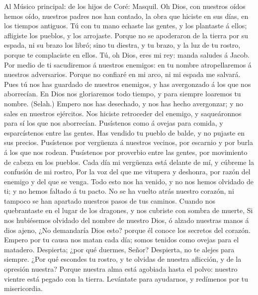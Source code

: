  Al Músico principal: de los hijos de Coré: Masquil. Oh
Dios, con nuestros oídos hemos oído, nuestros padres nos han contado, la
obra que hiciste en sus días, en los tiempos antiguos.  Tú
con tu mano echaste las gentes, y los plantaste á ellos; afligiste los
pueblos, y los arrojaste.  Porque no se apoderaron de la
tierra por su espada, ni su brazo los libró; sino tu diestra, y tu
brazo, y la luz de tu rostro, porque te complaciste en ellos.
 Tú, oh Dios, eres mi rey: manda saludes á Jacob.
 Por medio de ti sacudiremos á nuestros enemigos: en tu
nombre atropellaremos á nuestros adversarios.  Porque no
confiaré en mi arco, ni mi espada me salvará.  Pues tú nos
has guardado de nuestros enemigos, y has avergonzado á los que nos
aborrecían.  En Dios nos gloriaremos todo tiempo, y para
siempre loaremos tu nombre. (Selah.)  Empero nos has
desechado, y nos has hecho avergonzar; y no sales en nuestros ejércitos.
 Nos hiciste retroceder del enemigo, y saqueáronnos para
sí los que nos aborrecían.  Pusístenos como á ovejas para
comida, y esparcístenos entre las gentes.  Has vendido tu
pueblo de balde, y no pujaste en sus precios.  Pusístenos
por vergüenza á nuestros vecinos, por escarnio y por burla á los que nos
rodean.  Pusístenos por proverbio entre las gentes, por
movimiento de cabeza en los pueblos.  Cada día mi
vergüenza está delante de mí, y cúbreme la confusión de mi rostro,
 Por la voz del que me vitupera y deshonra, por razón del
enemigo y del que se venga.  Todo esto nos ha venido, y
no nos hemos olvidado de ti; y no hemos faltado á tu pacto.
 No se ha vuelto atrás nuestro corazón, ni tampoco se han
apartado nuestros pasos de tus caminos.  Cuando nos
quebrantaste en el lugar de los dragones, y nos cubriste con sombra de
muerte,  Si nos hubiésemos olvidado del nombre de nuestro
Dios, ó alzado nuestras manos á dios ajeno,  ¿No
demandaría Dios esto? porque él conoce los secretos del corazón.
 Empero por tu causa nos matan cada día; somos tenidos
como ovejas para el matadero.  Despierta; ¿por qué
duermes, Señor? Despierta, no te alejes para siempre. 
¿Por qué escondes tu rostro, y te olvidas de nuestra aflicción, y de la
opresión nuestra?  Porque nuestra alma está agobiada
hasta el polvo: nuestro vientre está pegado con la tierra.
 Levántate para ayudarnos, y redímenos por tu
misericordia.

